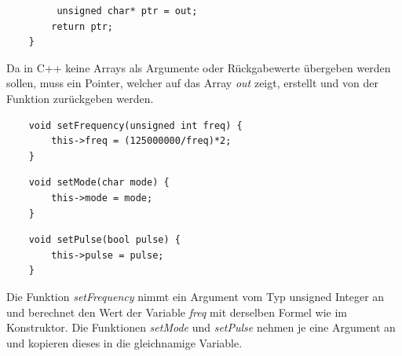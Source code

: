 \documentclass[12pt]{article}
\begin{document}
\begin{verbatim}
         unsigned char* ptr = out;
        return ptr;
    }
\end{verbatim}
\vspace{-2mm}
Da in C++ keine Arrays als Argumente oder Rückgabewerte übergeben werden sollen, muss ein Pointer, welcher auf das Array \textit{out} zeigt, erstellt und von der Funktion zurückgeben werden.\\
\begin{verbatim}
    void setFrequency(unsigned int freq) {
        this->freq = (125000000/freq)*2;
    }
\end{verbatim}
\begin{verbatim}
    void setMode(char mode) {
        this->mode = mode;
    }
\end{verbatim}
\begin{verbatim}
    void setPulse(bool pulse) {
        this->pulse = pulse;
    }
\end{verbatim}
\vspace{-2mm}
Die Funktion \textit{setFrequency} nimmt ein Argument vom Typ unsigned Integer an und berechnet den Wert der Variable \textit{freq} mit derselben Formel wie im Konstruktor.
Die Funktionen \textit{setMode} und \textit{setPulse} nehmen je eine Argument an und kopieren dieses in die gleichnamige Variable.\\
\end{document}
